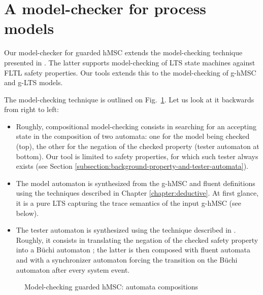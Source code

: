\section{A model-checker for process models\label{section:tool-model-checker}}

Our model-checker for guarded hMSC extends the model-checking technique presented in \cite{Giannakopoulou:2003}. The latter supports model-checking of LTS state machines against FLTL safety properties. Our tools extends this to the model-checking of g-hMSC and g-LTS models. 

The model-checking technique is outlined on Fig.~\ref{image:model-checking-technique}. Let us look at it backwards from right to left:
\begin{itemize}
\item Roughly, compositional model-checking consists in searching for an accepting state in the composition of two automata: one for the model being checked (top), the other for the negation of the checked property (tester automaton at bottom). Our tool is limited to safety properties, for which such tester always exists (see Section \ref{subsection:background-property-and-tester-automata}).
\item The model automaton is synthesized from the g-hMSC and fluent definitions using the techniques described in Chapter \ref{chapter:deductive}. At first glance, it is a pure LTS capturing the trace semantics of the input g-hMSC (see below).
\item The tester automaton is synthesized using the technique described in \cite{Giannakopoulou:2003}. Roughly, it consists in translating the negation of the checked safety property into a B\"uchi automaton \cite{Giannakopoulou:2002}; the latter is then composed with fluent automata and with a synchronizer automaton forcing the transition on the B\"uchi automaton after every system event. 
\end{itemize} 

\begin{figure}
\centering{}
  \caption{Model-checking guarded hMSC: automata compositions\label{image:model-checking-technique}}
\end{figure}

